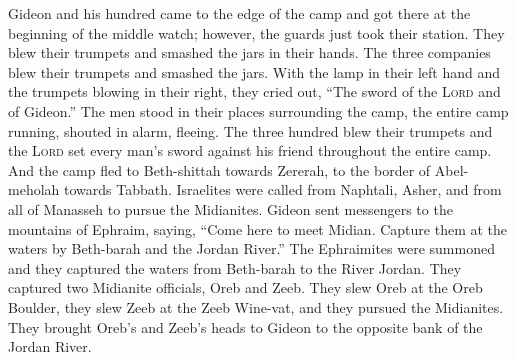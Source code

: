 \begin{inparaenum}
   Gideon and his hundred came to the edge of the camp and got there at the beginning of the middle watch; however, the guards just took their station. They blew their trumpets and smashed the jars in their hands.%
   The three companies blew their trumpets and smashed the jars. With the lamp in their left hand and the trumpets blowing in their right, they cried out, ``The sword of the \textsc{Lord} and of Gideon.''%
   The men stood in their places surrounding the camp, the entire camp running, shouted in alarm, fleeing.%
   The three hundred blew their trumpets and the \textsc{Lord} set every man's sword against his friend throughout the entire camp. And the camp fled to Beth-shittah towards Zererah, to the border of Abel-meholah towards Tabbath.%
   Israelites were called from Naphtali, Asher, and from all of Manasseh to pursue the Midianites.%
   Gideon sent messengers to the mountains of Ephraim, saying, ``Come here to meet Midian. Capture them at the waters by Beth-barah and the Jordan River.'' The Ephraimites were summoned and they captured the waters from Beth-barah to the River Jordan.%
   They captured two Midianite officials, Oreb and Zeeb. They slew Oreb at the Oreb Boulder, they slew Zeeb at the Zeeb Wine-vat, and they pursued the Midianites. They brought Oreb's and Zeeb's heads to Gideon to the opposite bank of the Jordan River.%
\end{inparaenum}

